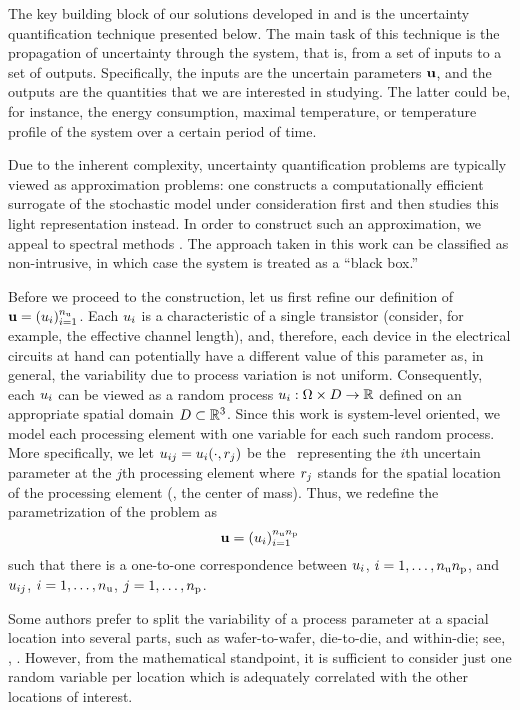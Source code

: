 The key building block of our solutions developed in  and  is the uncertainty quantification technique presented below.
The main task of this technique is the propagation of uncertainty through the system, that is, from a set of inputs to a set of outputs.
Specifically, the inputs are the uncertain parameters $\mathbf{u}$, and the outputs are the quantities that we are interested in studying.
The latter could be, for instance, the energy consumption, maximal temperature, or temperature profile of the system over a certain period of time.

Due to the inherent complexity, uncertainty quantification problems are typically viewed as approximation problems: one constructs a computationally efficient surrogate of the stochastic model under consideration first and then studies this light representation instead.
In order to construct such an approximation, we appeal to spectral methods \cite{maitre2010, janson1997, eldred2008}.
The approach taken in this work can be classified as non-intrusive, in which case the system is treated as a ``black box.''

Before we proceed to the construction, let us first refine our definition of $\mathbf{u} = (u_i)_{i = 1}^{n_\text{u}}$.
Each $u_i$ is a characteristic of a single transistor (consider, for example, the effective channel length), and, therefore, each device in the electrical circuits at hand can potentially have a different value of this parameter as, in general, the variability due to process variation is not uniform.
Consequently, each $u_i$ can be viewed as a random process $u_i: \Omega \times D \to \mathbb{R}$ defined on an appropriate spatial domain $D \subset \mathbb{R}^3$.
Since this work is system-level oriented, we model each processing element with one variable for each such random process.
More specifically, we let $u_{ij} = u_i(\cdot, r_j)$ be the \rv\ representing the $i$th uncertain parameter at the $j$th processing element where $r_j$ stands for the spatial location of the processing element (\eg, the center of mass).
Thus, we redefine the parametrization of the problem as
\begin{equation} \elab{uncertain-parameters}
  \vu = (\u_i)_{i = 1}^{\nparams \nprocs}
\end{equation}
such that there is a one-to-one correspondence between $u_i$, $i = 1, \dots, {n_\text{u}} {n_\text{p}}$, and $u_{ij}$, $i = 1, \dots, {n_\text{u}}$, $j = 1, \dots, {n_\text{p}}$.
\begin{remark}
Some authors prefer to split the variability of a process parameter at a spacial location into several parts, such as wafer-to-wafer, die-to-die, and within-die; see, \eg, \cite{juan2012}.
However, from the mathematical standpoint, it is sufficient to consider just one random variable per location which is adequately correlated with the other locations of interest.
\end{remark}

